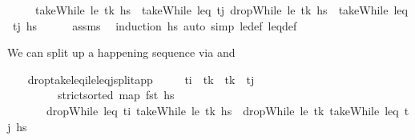 \begin{isabellebody}
\ \ \ \ \ {\isachardoublequoteopen}takeWhile\ {\isacharparenleft}{\kern0pt}le\ t\isactrlsub k{\isacharparenright}{\kern0pt}\ hs\ {\isacharat}{\kern0pt}\ takeWhile\ {\isacharparenleft}{\kern0pt}leq\ t\isactrlsub j{\isacharparenright}{\kern0pt}\ {\isacharparenleft}{\kern0pt}dropWhile\ {\isacharparenleft}{\kern0pt}le\ t\isactrlsub k{\isacharparenright}{\kern0pt}\ hs{\isacharparenright}{\kern0pt}\ {\isacharequal}{\kern0pt}\ takeWhile\ {\isacharparenleft}{\kern0pt}leq\ t\isactrlsub j{\isacharparenright}{\kern0pt}\ hs{\isachardoublequoteclose}\isanewline
%
\isadelimproof
\ \ \ \ %
\endisadelimproof
%
\isatagproof
{}\isamarkupfalse%
\ assms\ \isamarkupfalse%
\ {\isacharparenleft}{\kern0pt}induction\ hs{\isacharparenright}{\kern0pt}\ {\isacharparenleft}{\kern0pt}auto\ simp{\isacharcolon}{\kern0pt}\ le{\isacharunderscore}{\kern0pt}def\ leq{\isacharunderscore}{\kern0pt}def{\isacharparenright}{\kern0pt}%
\endisatagproof
{\isafoldproof}%
%
\isadelimproof
%
\endisadelimproof
%
\begin{isamarkuptext}%
We can split up a happening sequence via  and %
\end{isamarkuptext}\isamarkuptrue%
\ \ \isamarkupfalse%
\ drop{\isacharunderscore}{\kern0pt}take{\isacharunderscore}{\kern0pt}leq\isactrlsub i{\isacharunderscore}{\kern0pt}le{\isacharunderscore}{\kern0pt}leq\isactrlsub j{\isacharunderscore}{\kern0pt}split{\isacharunderscore}{\kern0pt}app{\isacharcolon}{\kern0pt}\isanewline
\ \ \ \ \ {\isachardoublequoteopen}t\isactrlsub i\ {\isacharless}{\kern0pt}\ t\isactrlsub k{\isachardoublequoteclose}\ \ {\isachardoublequoteopen}t\isactrlsub k\ {\isasymle}\ t\isactrlsub j{\isachardoublequoteclose}\isanewline
\ \ \ \ \ \ \ \ \ {\isachardoublequoteopen}strict{\isacharunderscore}{\kern0pt}sorted\ {\isacharparenleft}{\kern0pt}map\ fst\ hs{\isacharparenright}{\kern0pt}{\isachardoublequoteclose}\isanewline
\ \ \ \ \ \ \ {\isachardoublequoteopen}dropWhile\ {\isacharparenleft}{\kern0pt}leq\ t\isactrlsub i{\isacharparenright}{\kern0pt}\ {\isacharparenleft}{\kern0pt}takeWhile\ {\isacharparenleft}{\kern0pt}le\ t\isactrlsub k{\isacharparenright}{\kern0pt}\ hs{\isacharparenright}{\kern0pt}\ {\isacharat}{\kern0pt}\ dropWhile\ {\isacharparenleft}{\kern0pt}le\ t\isactrlsub k{\isacharparenright}{\kern0pt}\ {\isacharparenleft}{\kern0pt}takeWhile\ {\isacharparenleft}{\kern0pt}leq\ t\isactrlsub j{\isacharparenright}{\kern0pt}\ hs{\isacharparenright}{\kern0pt}\ \isanewline

\end{isabellebody}
